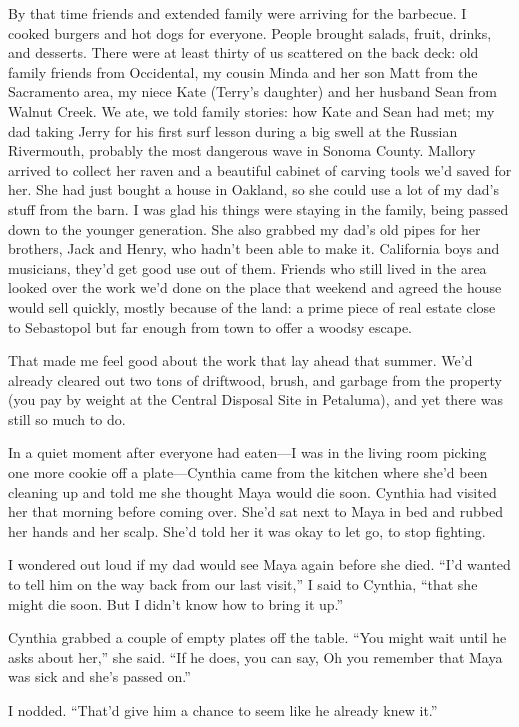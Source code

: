 \documentclass[12pt]{book}
\begin{document}
By that time friends and extended family were arriving for the barbecue. I cooked burgers and hot dogs for everyone. People brought salads, fruit, drinks, and desserts. There were at least thirty of us scattered on the back deck: old family friends from Occidental, my cousin Minda and her son Matt from the Sacramento area, my niece Kate (Terry's daughter) and her husband Sean from Walnut Creek. We ate, we told family stories: how Kate and Sean had met; my dad taking Jerry for his first surf lesson during a big swell at the Russian Rivermouth, probably the most dangerous wave in Sonoma County. Mallory arrived to collect her raven and a beautiful cabinet of carving tools we'd saved for her. She had just bought a house in Oakland, so she could use a lot of my dad's stuff from the barn. I was glad his things were staying in the family, being passed down to the younger generation. She also grabbed my dad's old pipes for her brothers, Jack and Henry, who hadn't been able to make it. California boys and musicians, they'd get good use out of them. Friends who still lived in the area looked over the work we'd done on the place that weekend and agreed the house would sell quickly, mostly because of the land: a prime piece of real estate close to Sebastopol but far enough from town to offer a woodsy escape.

That made me feel good about the work that lay ahead that summer. We'd already cleared out two tons of driftwood, brush, and garbage from the property (you pay by weight at the Central Disposal Site in Petaluma), and yet there was still so much to do.

In a quiet moment after everyone had eaten---I was in the living room picking one more cookie off a plate---Cynthia came from the kitchen where she'd been cleaning up and told me she thought Maya would die soon. Cynthia had visited her that morning before coming over. She'd sat next to Maya in bed and rubbed her hands and her scalp. She'd told her it was okay to let go, to stop fighting.

I wondered out loud if my dad would see Maya again before she died. ``I'd wanted to tell him on the way back from our last visit,'' I said to Cynthia, ``that she might die soon. But I didn't know how to bring it up.''

Cynthia grabbed a couple of empty plates off the table. ``You might wait until he asks about her,'' she said. ``If he does, you can say, Oh you remember that Maya was sick and she's passed on.''

I nodded. ``That'd give him a chance to seem like he already knew it.''
\end{document}

